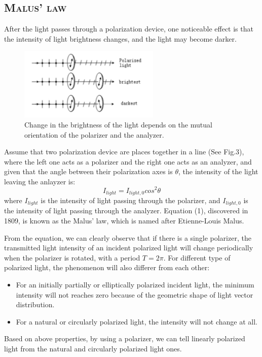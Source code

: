 \documentclass[a4paper,12pt]{article}
\begin{document}
\subsection{\textsc{Malus' law}}
After the light passes through a polarization device, one noticeable effect is that the intensity of light brightness changes, and the light may become darker.

\begin{figure}[h] 
    \centering
    \includegraphics[width=0.6\textwidth]{Fig3} 
    \caption{Change in the brightness of the light depends on the mutual orientation of the polarizer and the analyzer. \cite{labmanual}} 
\end{figure}

Assume that two polarization device are places together in a line (See Fig.3), where the left one acts as a polarizer and the right one acts as an analyzer, and given that the angle between their polarization axes is $\theta$, the intensity of the light leaving the anlayzer is:
\begin{equation}
I_{light} = I_{light,0} cos^2\theta
\end{equation}
where $I_{light}$ is the intensity of light passing through the polarizer, and $I_{light,0}$ is the intensity of light passing through the analyzer. Equation (1), discovered in 1809, is known as the Malus’ law, which is named after Etienne-Louis Malus.

\par From the equation, we can clearly observe that if there is a single polarizer, the transmitted light intensity of an incident polarized light will change periodically when the polarizer is rotated, with a period $T = 2\pi$. For different type of polarized light, the phenomenon will also differer from each other:
\begin{itemize}
\item For an initially partially or elliptically polarized incident light, the minimum intensity will not reaches zero because of the geometric shape of light vector distribution. 
\item For a natural or circularly polarized light, the intensity will not change at all.
\end{itemize}
Based on above properties, by using a polarizer, we can tell linearly polarized light from the natural and circularly polarized light ones.
\end{document}
